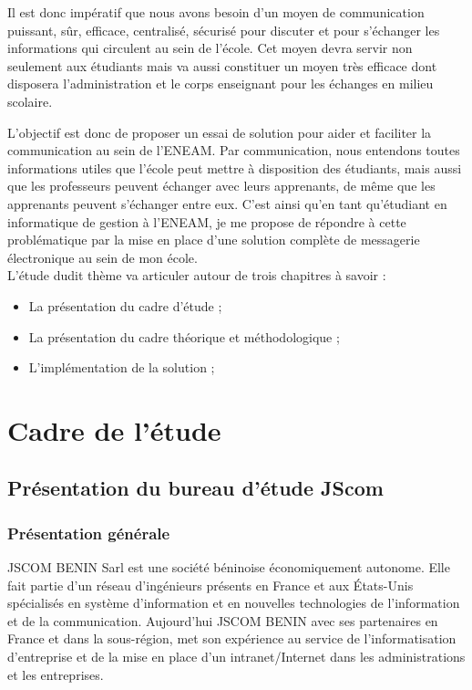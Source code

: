 \documentclass[a4paper,12pt,french]{report} %
\begin{document}
Il est donc impératif que nous avons besoin d'un moyen de communication puissant, sûr, efficace, centralisé, sécurisé pour discuter et pour s'échanger les informations qui circulent au sein de l'école. Cet moyen devra servir non seulement aux étudiants mais va aussi constituer un moyen très efficace dont disposera l'administration et le corps enseignant pour les échanges en milieu scolaire. 

L'objectif est donc de proposer un essai de solution pour aider et faciliter la communication au sein de l'ENEAM. Par communication, nous entendons toutes informations utiles que l'école peut mettre à disposition des étudiants, mais aussi que les professeurs peuvent échanger avec leurs apprenants, de même que les apprenants peuvent s'échanger entre eux. C'est ainsi qu'en tant qu'étudiant en informatique de gestion à l'ENEAM, je me propose de répondre à cette problématique par la mise en place d'une solution complète de messagerie électronique au sein de mon école. \\

L'étude dudit thème va articuler autour de trois chapitres à savoir :
\begin{itemize}
	\item La présentation du cadre d'étude ;
	\item La présentation du cadre théorique et méthodologique ;
	\item L'implémentation de la solution ;
\end{itemize}

\chapter{Cadre de l'étude}

\section{Présentation du bureau d'étude JScom}
	\subsection{Présentation générale}
	JSCOM BENIN Sarl est une société béninoise économiquement autonome. Elle fait partie d'un réseau d'ingénieurs présents en France et aux États-Unis spécialisés en système d'information et en nouvelles technologies de l'information et de la communication. Aujourd'hui JSCOM BENIN avec ses partenaires en France et dans la sous-région, met son expérience au service de l'informatisation d'entreprise et de la mise en place d'un intranet/Internet dans les administrations et les entreprises.
\end{document}
